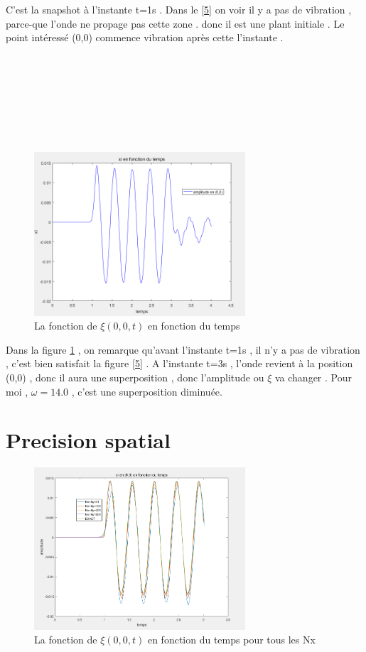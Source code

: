 \documentclass[a4paper,10pt]{report} %
\begin{document}
C'est la snapshot à l'instante t=1s . Dans le \ref{5} on voir il y a pas de vibration , parce-que l'onde ne propage pas cette zone . donc il est une plant initiale . Le point intéressé (0,0) commence vibration après cette l'instante .\\\\\\\\\\\\\\\ 
\begin{figure}[h]
\centering
\includegraphics[width=0.7\textwidth]{fig/figure10.png}
\caption{La fonction de $\xi(0,0,t)$ en fonction du temps}
\label{10}
\end{figure}

 Dans la figure \ref{10} , on remarque qu'avant l'instante t=1s , il n'y a pas de vibration , c'est bien satisfait la figure \ref{5} . A l'instante t=3s , l'onde revient à la position (0,0) , donc il aura une superposition , donc l'amplitude ou $\xi$ va changer . Pour moi , $\omega=14.0$ , c'est une superposition diminuée.  
\section{Precision spatial}
\begin{figure}[h]
\centering
\includegraphics[width=0.7\textwidth]{fig/figure8.png}
\caption{La fonction de $\xi(0,0,t)$ en fonction du temps pour tous les Nx}
\label{8}
\end{figure}
\end{document}
